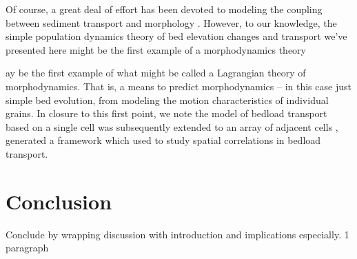 \documentclass[draft]{agujournal2018}
\begin{document}
Of course, a great deal of effort has been devoted to modeling the coupling between sediment transport and morphology \citep[e.g.][]{Pelosi2014}.
However, to our knowledge, the simple population dynamics theory of bed elevation changes and transport we've presented here might be the first example of a morphodynamics theory 


ay be the first example of what might be called a Lagrangian theory of morphodynamics.
That is, a means to predict morphodynamics -- in this case just simple bed evolution, from modeling the motion characteristics of individual grains.
In closure to this first point, we note the \citet{Ancey2008} model of bedload transport based on a single cell was subsequently extended to an array of adjacent cells \citep{Ancey2014a}, generated a framework which \citet{Heyman2014} used to study spatial correlations in bedload transport.

\section{Conclusion}

Conclude by wrapping discussion with introduction and implications especially. 1 paragraph 
\end{document}
